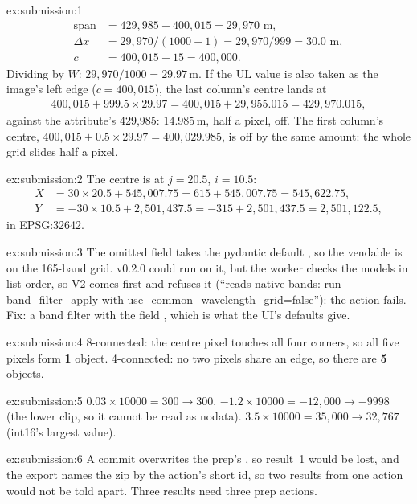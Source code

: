
\begin{solution}{ex:submission:1}
\begin{align*}
\text{span} &= 429{,}985-400{,}015 = 29{,}970\text{ m},\\
\Delta x &= 29{,}970/(1000-1) = 29{,}970/999 = 30.0\text{ m},\\
c &= 400{,}015-15 = 400{,}000 .
\end{align*}
Dividing by $W$: $29{,}970/1000=29.97$\,m. If the UL value is also taken as the image's left edge ($c=400{,}015$), the
last column's centre lands at
\begin{align*}
400{,}015+999.5\times29.97 = 400{,}015+29{,}955.015 = 429{,}970.015,
\end{align*}
against the attribute's 429,985: $14.985$\,m, half a pixel, off. The first column's centre,
$400{,}015+0.5\times29.97=400{,}029.985$, is off by the same amount: the whole grid slides half a pixel.
\end{solution}

\begin{solution}{ex:submission:2}
The centre is at $j=20.5$, $i=10.5$:
\begin{align*}
X &= 30\times20.5+545{,}007.75 = 615+545{,}007.75 = 545{,}622.75,\\
Y &= -30\times10.5+2{,}501{,}437.5 = -315+2{,}501{,}437.5 = 2{,}501{,}122.5,
\end{align*}
in EPSG:32642.
\end{solution}

\begin{solution}{ex:submission:3}
The omitted field takes the pydantic default , so the vendable is on the 165-band grid. v0.2.0 could run on
it, but the worker checks the models in list order, so V2 comes first and  refuses it
(``reads native bands: run band\_filter\_apply with use\_common\_wavelength\_grid=false''): the action fails. Fix: a band filter with the field
, which is what the UI's defaults give.
\end{solution}

\begin{solution}{ex:submission:4}
8-connected: the centre pixel touches all four corners, so all five pixels form \textbf{1} object. 4-connected: no two
pixels share an edge, so there are \textbf{5} objects.
\end{solution}

\begin{solution}{ex:submission:5}
$0.03\times10000=300\to300$. $-1.2\times10000=-12{,}000\to-9998$ (the lower clip, so it cannot be read as nodata).
$3.5\times10000=35{,}000\to32{,}767$ (int16's largest value).
\end{solution}

\begin{solution}{ex:submission:6}
A commit overwrites the prep's , so result~1 would be lost, and the export names the zip by the
action's short id, so two results from one action would not be told apart. Three results need three prep actions.
\end{solution}
